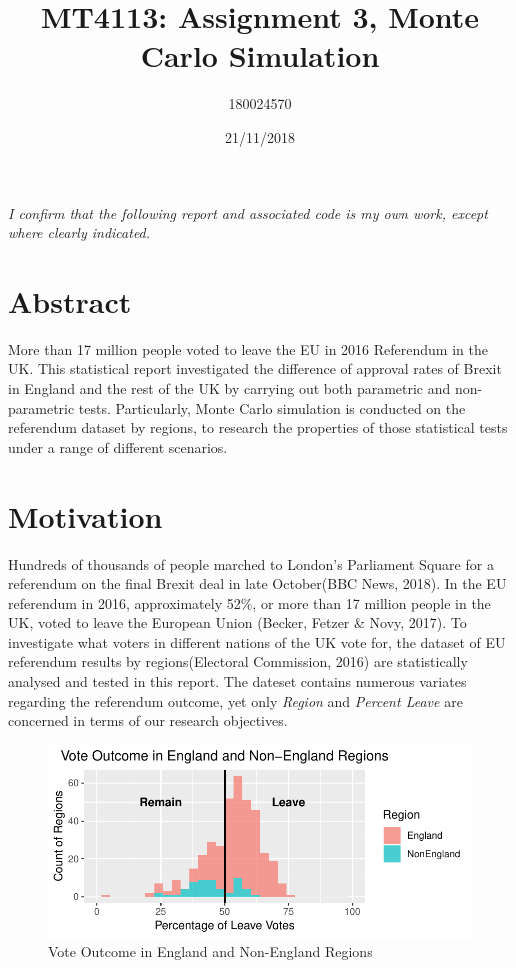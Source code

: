\documentclass[]{article}
\title{MT4113: Assignment 3, Monte Carlo Simulation}
\author{180024570}
\date{21/11/2018}
\begin{document}
\maketitle

\emph{I conﬁrm that the following report and associated code is my own
work, except where clearly indicated.}

\hypertarget{abstract}{%
\section{Abstract}\label{abstract}}

More than 17 million people voted to leave the EU in 2016 Referendum in
the UK. This statistical report investigated the difference of approval
rates of Brexit in England and the rest of the UK by carrying out both
parametric and non-parametric tests. Particularly, Monte Carlo
simulation is conducted on the referendum dataset by regions, to
research the properties of those statistical tests under a range of
different scenarios.

\hypertarget{motivation}{%
\section{Motivation}\label{motivation}}

Hundreds of thousands of people marched to London's Parliament Square
for a referendum on the final Brexit deal in late October(BBC News,
2018). In the EU referendum in 2016, approximately 52\%, or more than 17
million people in the UK, voted to leave the European Union (Becker,
Fetzer \& Novy, 2017). To investigate what voters in different nations
of the UK vote for, the dataset of EU referendum results by
regions(Electoral Commission, 2016) are statistically analysed and
tested in this report. The dateset contains numerous variates regarding
the referendum outcome, yet only \emph{Region} and \emph{Percent Leave}
are concerned in terms of our research objectives.

\begin{figure}
\centering
\includegraphics{../figure/datasetHist.pdf}
\caption{Vote Outcome in England and Non-England Regions}
\end{figure}
\end{document}

